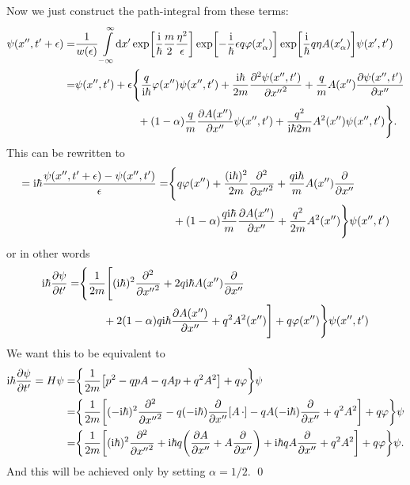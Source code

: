\documentclass[11pt,letter, swedish, english
]{article}
\begin{document}
Now we just construct the path-integral from these terms:
\begin{equation}
\begin{aligned}
\psi(x'', t'+\epsilon)
=&\frac{1}{w(\epsilon)}\int_{-\infty}^{\infty}\!\rd{x'}
\exp[\frac{\ii}{\hbar}\frac{m}{2}\frac{\eta^2}{\epsilon}]
\exp[-\frac{\ii}{\hbar}\epsilon q\varphi(x'_\alpha)]
\exp[\frac{\ii}{\hbar} q\eta A(x'_\alpha)]
\psi(x', t')\\
=& \psi(x'', t') + \epsilon \Bigg\{
\frac{q}{\ii\hbar}\varphi(x'')\psi(x'', t')
+\frac{\ii\hbar}{2m}\pdv[2]{\psi(x'', t')}{{x''}}
+\frac{q}{m}A(x'')\pdv{\psi(x'', t')}{x''}\\
&\phantom{\psi(x'', t') + \epsilon\{ }
+(1-\alpha)\frac{q}{m}\pdv{A(x'')}{x''}\psi(x'', t')
+\frac{q^2}{\ii\hbar2m}A^2(x'')\psi(x'', t')
\Bigg\}.
\end{aligned}
\end{equation}
This can be rewritten to%
\begin{equation}
\begin{aligned}
=\mathrm{i}\hbar\frac{\psi(x'', t'+\epsilon)-\psi(x'', t')}{\epsilon}
=&  \Bigg\{
q\varphi(x'')
+\frac{(\mathrm{i}\hbar)^2}{2m}\pdv[2]{{x''}}
+\frac{q\mathrm{i}\hbar}{m}A(x'')\pdv{x''}\\
&\phantom{(}
+(1-\alpha)\frac{q\mathrm{i}\hbar}{m}\pdv{A(x'')}{x''}
+\frac{q^2}{2m}A^2(x'')
\Bigg\}\psi(x'', t')
\end{aligned}
\end{equation}
or in other words
\begin{equation}
\begin{aligned}
\mathrm{i}\hbar\pdv{\psi}{{t'}}
=&  \Bigg\{\frac{1}{2m}\Bigg[
(\mathrm{i}\hbar)^2\pdv[2]{{x''}}
+2q\mathrm{i}\hbar A(x'')\pdv{x''}\\
&\phantom{(2m)}
+2(1-\alpha)q\mathrm{i}\hbar\pdv{A(x'')}{x''}
+q^2A^2(x'')\Bigg]
+q\varphi(x'')\Bigg\}\psi(x'', t')
\end{aligned}
\end{equation}
We want this to be equivalent to 
\begin{equation}
\begin{aligned}
\mathrm{i}\hbar\pdv{\psi}{{t'}}
=H\psi
=&\qty{\frac{1}{2m}\qty[p^2 - qpA-qAp+q^2A^2] + q\varphi}\psi\\
=&\qty{\frac{1}{2m}\qty[(-\mathrm{i}\hbar)^2\pdv[2]{{x''}} 
- q(-\mathrm{i}\hbar) \pdv{x''}[A\,\cdot]
-qA(-\mathrm{i}\hbar)\pdv{x''}+q^2A^2] + q\varphi}\psi\\
=&\qty{\frac{1}{2m}\qty[(\mathrm{i}\hbar)^2\pdv[2]{{x''}} 
+ \mathrm{i}\hbar q\qty(\pdv{A}{x''}+A\pdv{x''})
+\mathrm{i}\hbar qA\pdv{x''}+q^2A^2] + q\varphi}\psi.
\end{aligned}
\end{equation}
And this will be achieved only by setting $\alpha=1/2$.
\qed
\end{document}
